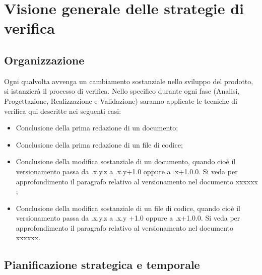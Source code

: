 
\section{Visione generale delle strategie di verifica}

\subsection{Organizzazione}

Ogni qualvolta avvenga un cambiamento sostanziale nello sviluppo del prodotto, si istanzierà il processo di verifica.
Nello specifico durante ogni fase (Analisi, Progettazione, Realizzazione e Validazione) saranno applicate le tecniche di verifica qui descritte nei seguenti casi:
\begin{itemize}

\item Conclusione della prima redazione di un documento;

\item Conclusione della prima redazione di un file di codice;

\item Conclusione della modifica sostanziale di un documento, quando cioè il versionamento passa da .x.y.z a .x.y+1.0 oppure a .x+1.0.0. Si veda per approfondimento il paragrafo relativo al versionamento nel documento xxxxxx ;

\item Conclusione della modifica sostanziale di un file di codice, quando cioè il versionamento passa da .x.y.z a .x.y +1.0 oppure a .x+1.0.0. Si veda per approfondimento il paragrafo relativo al versionamento nel documento xxxxxx.
\end{itemize}
\subsection{Pianificazione strategica e temporale}

